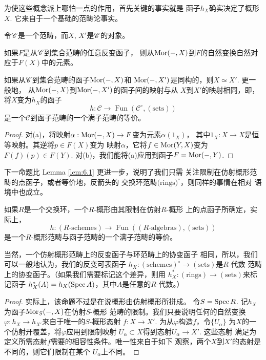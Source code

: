 为使这些概念派上哪怕一点的作用，首先关键的事实就是
函子$h_X$确实决定了概形$X$. 它来自于一个基础的范畴论事实。

\begin{lem}[Yoneda引理]\label{lem:6.1}
令$\mathscr{C}$是一个范畴，而$X$, $X'$是$\mathscr{C}$的对象。
\begin{compactenum}[(\rm a)]
\item 如果$F$是从$\mathscr{C}$到集合范畴的任意反变函子，
则从$\operatorname{Mor}(-,X)$到$F$的自然变换自然对应于$F(X)$中的元素。
\item 如果从$\mathscr{C}$到集合范畴的函子$\operatorname{Mor}(-,X)$和
$\operatorname{Mor}(-,X')$是同构的，则$X\simeq X'$. 更一般地，
从$\operatorname{Mor}(-,X)$到$\operatorname{Mor}(-,X')$的函子间的映射与从
$X$到$X'$的映射相同，即，将$X$变为$h_X$的函子
\[
	h:\mathscr C\to \operatorname{Fun}
	(\mathscr C^\circ,(\text{sets}))
\]
是一个$\mathscr C$到函子范畴的一个满子范畴的等价。
\end{compactenum}
\end{lem}


\begin{proof}
对(a)，将映射$\alpha:\operatorname{Mor}(-,X)\to F$变为元素$\alpha(1_X)$，
其中$1_X:X\to X$是恒等映射。其逆将$p\in F(X)$变为
映射$\alpha$，它将$f\in \operatorname{Mor}(Y,X)$变为$F(f)(p)\in F(Y)$. 
对(b)，我们能将(a)应用到函子$F=\operatorname{Mor}(-,Y)$.
\end{proof}

下一命题比 Lemma \ref{lem:6.1} 更进一步，说明了我们只需
关注限制在仿射概形范畴的点函子，或者等价地，反箭头的
交换环范畴$\text{(rings)}^\circ$，则同样的事情在相对
语境中也成立。

\begin{pro}\label{pro:6.2}
如果$R$是一个交换环，一个$R$-概形由其限制在仿射$R$-概形
上的点函子所确定，实际上，
\[
	h:(\text{$R$-schemes})\to \operatorname{Fun}
	((\text{$R$-algebras}),(\text{sets}))
\]
是一个$R$-概形范畴与函子范畴的一个满子范畴的等价。
\end{pro}

当然，一个仿射概形范畴上的反变函子与环范畴上的协变函子
相同，所以，我们可以一般地认为，我们的反变可表函子
$h_X:(\text{schemes})^\circ \to (\text{sets})$是$R$-代数
范畴上的协变函子。（如果我们需要标记这个差异，则用
$h_X^*:(\text{rings})\to (\text{sets})$来标记函子
$h_X^*(A)=h_X(\operatorname{Spec} A)$，其中$A$是任意的$R$-代数。）

\begin{proof}
实际上，该命题不过是在说概形由仿射概形所拼成。
令$S=\operatorname{Spec} R$. 记$h_X$为函子$\operatorname{Mor}_S(-,X)$在仿射$S$-概形
范畴的限制。我们只要说明任何的自然变换
$\varphi:h_X\to h_{X'}$来自于唯一的$S$-概形态射
$f:X\to X'$. 为从$\varphi$构造$f$，令$\{U_\alpha\}$
为$X$的一个仿射开覆盖，将$\varphi$应用到限制映射
$U_\alpha\subset X$得到态射$U_\alpha\to X'$. 这些态射
满足为定义所需态射$f$需要的相容性条件。唯一性来自于如下
观察，两个$X$到$X'$的态射是不同的，则它们限制在某个
$U_\alpha$上不同。
\end{proof}

